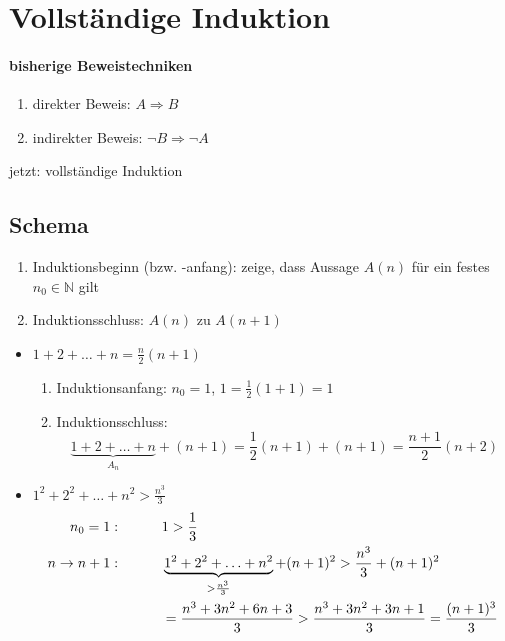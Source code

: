 
\section{Vollständige Induktion}

\paragraph{bisherige Beweistechniken}

\begin{enumerate}
 \item direkter Beweis: $A \Rightarrow B$
 \item indirekter Beweis: $\neg B \Rightarrow \neg A$
\end{enumerate}

jetzt: vollständige Induktion

\subsection{Schema}

\begin{enumerate}
 \item Induktionsbeginn (bzw. -anfang): zeige, dass Aussage $A(n)$ für ein festes $n_0 \in \mathbb{N}$ gilt
 \item Induktionsschluss: $A(n)$ zu $A(n+1)$
\end{enumerate}

\begin{example}
 \begin{itemize}
  \item $1+2+\ldots+n = \frac n 2 (n+1)$
    \begin{enumerate}
    \item Induktionsanfang: $n_0 = 1$, $1 = \frac 1 2 (1+1) = 1$
    \item Induktionsschluss: \[\underbrace{1+2+\ldots+n}_{A_n} + (n+1) = \frac 1 2 (n+1) + (n+1) = \frac{n+1}2 (n+2)\]
    \end{enumerate}
  \item $1^2+2^2+\ldots+n^2 > \frac{n^3}3$
    \begin{align*}
      n_0 = 1:\text{\hspace{1cm}} &1 > \frac 1 3 \text{\hspace{1cm}} \\
      n \rightarrow n + 1 :\text{\hspace{1cm}} &\underbrace{1^2+2^2+\ldots+n^2}_{>\frac{n^3}3}+(n+1)^2 > \frac{n^3}3+(n+1)^2 \\
      &= \frac{n^3+3n^2+6n+3}3 > \frac{n^3+3n^2+3n+1}3 = \frac{(n+1)^3}3
    \end{align*}
 \end{itemize}
\end{example}

